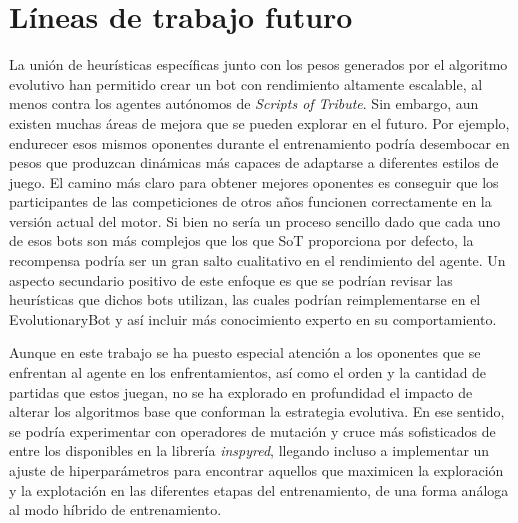 
\section{Líneas de trabajo futuro} \label{sec:trabajo_futuro}

La unión de heurísticas específicas junto con los pesos generados por el algoritmo evolutivo han permitido crear un bot con rendimiento altamente escalable, al menos contra los agentes autónomos de \textit{Scripts of Tribute}. Sin embargo, aun existen muchas áreas de mejora que se pueden explorar en el futuro. Por ejemplo, endurecer esos mismos oponentes durante el entrenamiento podría desembocar en pesos que produzcan dinámicas más capaces de adaptarse a diferentes estilos de juego. El camino más claro para obtener mejores oponentes es conseguir que los participantes de las competiciones de otros años funcionen correctamente en la versión actual del motor. Si bien no sería un proceso sencillo dado que cada uno de esos bots son más complejos que los que SoT proporciona por defecto, la recompensa podría ser un gran salto cualitativo en el rendimiento del agente. Un aspecto secundario positivo de este enfoque es que se podrían revisar las heurísticas que dichos bots utilizan, las cuales podrían reimplementarse en el EvolutionaryBot y así incluir más conocimiento experto en su comportamiento.

Aunque en este trabajo se ha puesto especial atención a los oponentes que se enfrentan al agente en los enfrentamientos, así como el orden y la cantidad de partidas que estos juegan, no se ha explorado en profundidad el impacto de alterar los algoritmos base que conforman la estrategia evolutiva. En ese sentido, se podría experimentar con operadores de mutación y cruce más sofisticados de entre los disponibles en la librería \textit{inspyred}, llegando incluso a implementar un ajuste de hiperparámetros para encontrar aquellos que maximicen la exploración y la explotación en las diferentes etapas del entrenamiento, de una forma análoga al modo híbrido de entrenamiento.

